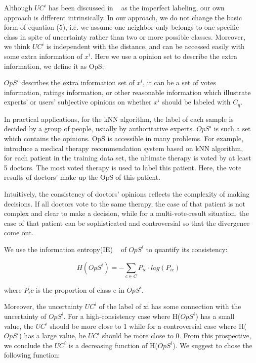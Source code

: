 \documentclass[runningheads]{llncs}
\begin{document}
Although $UC^i$ has been discussed in ~\cite{ref_article3} as the imperfect labeling, our own approach is different intrinsically. In our approach, we do not change the basic form of equation (5), i.e. we assume one neighbor only belongs  to one specific class in spite of uncertainty rather than two or more possible classes. Moreover,  we think $UC^i$ is independent with the distance, and can be accessed easily with some extra information of $x^i$. Here we use a opinion set to describe the extra information, we define it as OpS:

\begin{definition}
 $OpS^i$ describes the extra information set of $x^i$, it can be a set of votes information, ratings information, or other reasonable information which illustrate experts' or users' subjective opinions on whether $x^i$ should be labeled with $C_q$.
\end{definition}

In practical applications, for the kNN algorithm, the label of each sample is decided by a group of people, usually by authoritative experts. $OpS^i$ is such a set which contains the opinions. OpS is accessible in many problems. For example, ~\cite{ref_article9} introduce a medical therapy recommendation system based on kNN algorithm, for each patient in the training data set,  the ultimate therapy is voted by at least 5 doctors. The most voted therapy is used to label this patient. Here, the vote results of doctors' make up the OpS of this patient.

Intuitively, the consistency of doctors' opinions reflects the complexity of making decisions. If all doctors vote to the same therapy, the case of that patient is not complex and clear to make a decision, while for a multi-vote-result situation, the case of that patient can be sophisticated and controversial so that the divergence come out. 

We use the information entropy(IE) ~\cite{ref_article12} of $OpS^i$ to quantify its consistency:

\begin{equation}
H(OpS^i) =- \sum_{c \in C} P_{ic} \cdot log (P_{ic})
\end{equation}

where $P_ic$ is the proportion of class c in $OpS^i$.

Moreover, the uncertainty $UC^i$ of the label of xi has some connection with the uncertainty of $OpS^i$. For a high-consistency case where H($OpS^i$) has a small value, the $UC^i$ should be more close to 1 while for a controversial case where H($OpS^i$) has a large value, he $UC^i$ should be more close to 0. From this prospective, we conclude the $UC^i$ is a decreasing function of H($OpS^i$). We suggest to chose the following function:
\end{document}
